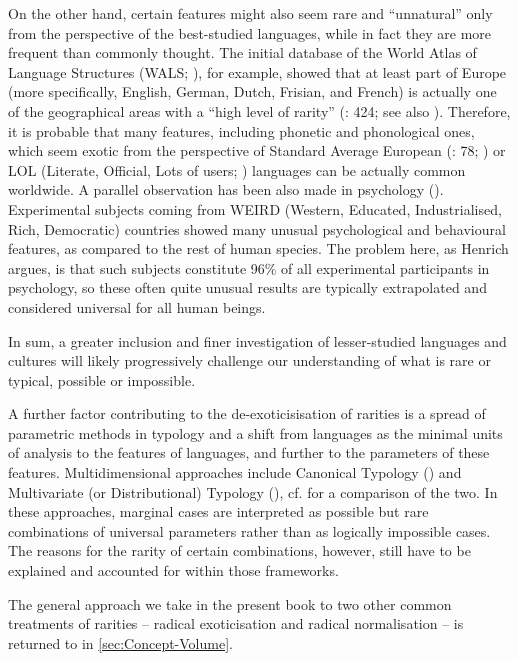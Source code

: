 \documentclass[output=paper]{langscibook}
\begin{document}
On the other hand, certain features might also seem rare and “unnatural” only from the perspective of the best-studied languages, while in fact they are more frequent than commonly thought. The initial database of the World Atlas of Language Structures (WALS; \citealt{DryerEtAl2005}), for example, showed that at least part of Europe (more specifically, English, German, Dutch, Frisian, and French) is actually one of the geographical areas with a “high level of rarity” (\citealt{Cysouw2011}: 424; see also \citealt{Dahl1990}). Therefore, it is probable that many features, including phonetic and phonological ones, which seem exotic from the perspective of Standard Average European (\citealt{Whorf1941}: 78; \citealt{Haspelmath2001, Auwera2011}) or LOL (Literate, Official, Lots of users; \citealt{Dahl2015}) languages can be actually common worldwide. A parallel observation has been also made in psychology (\citealt{HeineNorenzayan2010, Henrich2021}). Experimental subjects coming from WEIRD (Western, Educated, Industrialised, Rich, Democratic) countries showed many unusual psychological and behavioural features, as compared to the rest of human species. The problem here, as Henrich argues, is that such subjects constitute 96\% of all experimental participants in psychology, so these often quite unusual results are typically extrapolated and considered universal for all human beings.

In sum, a greater inclusion and finer investigation of lesser-studied languages and cultures will likely progressively challenge our understanding of what is rare or typical, possible or impossible. 

A further factor contributing to the de-exoticisisation of rarities is a spread of parametric methods in typology and a shift from languages as the minimal units of analysis to the features of languages, and further to the parameters of these features. Multidimensional approaches include Canonical Typology (\citealt{Corbett2007, Hyman2014, RoundCorbett2020}) and Multivariate (or Distributional) Typology (\citealt{Bickel2015, Tallman2020}), cf. \citet{Forker2016} for a comparison of the two. In these approaches, marginal cases are interpreted as possible but rare combinations of universal parameters rather than as logically impossible cases. The reasons for the rarity of certain combinations, however, still have to be explained and accounted for within those frameworks.

\largerpage
The general approach we take in the present book to two other common treatments of rarities – radical exoticisation and radical normalisation – is returned to in \cref{sec:Concept-Volume}.
\end{document}
